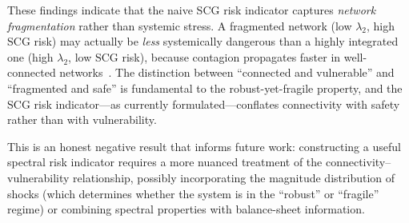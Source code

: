 These findings indicate that the naive SCG risk indicator captures
\emph{network fragmentation} rather than systemic stress.  A fragmented
network (low $\lambda_2$, high SCG risk) may actually be \emph{less}
systemically dangerous than a highly integrated one (high $\lambda_2$,
low SCG risk), because contagion propagates faster in
well-connected networks~\cite{acemoglu2015systemic,haldane2011systemic}.
The distinction between ``connected and vulnerable'' and ``fragmented
and safe'' is fundamental to the robust-yet-fragile property, and the
SCG risk indicator---as currently formulated---conflates connectivity
with safety rather than with vulnerability.

This is an honest negative result that informs future work: constructing
a useful spectral risk indicator requires a more nuanced treatment of
the connectivity--vulnerability relationship, possibly incorporating
the magnitude distribution of shocks (which determines whether the
system is in the ``robust'' or ``fragile'' regime) or combining spectral
properties with balance-sheet information.
